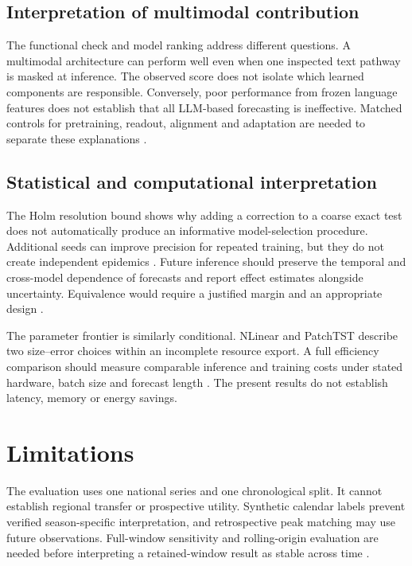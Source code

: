 \documentclass[journal,twoside,print]{ieeecolor}
\begin{document}
\subsection{Interpretation of multimodal contribution}
The functional check and model ranking address different questions. A multimodal architecture can perform well even when one inspected text pathway is masked at inference. The observed score does not isolate which learned components are responsible. Conversely, poor performance from frozen language features does not establish that all LLM-based forecasting is ineffective. Matched controls for pretraining, readout, alignment and adaptation are needed to separate these explanations \cite{r6,r13}.

\subsection{Statistical and computational interpretation}
The Holm resolution bound shows why adding a correction to a coarse exact test does not automatically produce an informative model-selection procedure. Additional seeds can improve precision for repeated training, but they do not create independent epidemics \cite{r19}. Future inference should preserve the temporal and cross-model dependence of forecasts and report effect estimates alongside uncertainty. Equivalence would require a justified margin and an appropriate design \cite{r25}.

The parameter frontier is similarly conditional. NLinear and PatchTST describe two size--error choices within an incomplete resource export. A full efficiency comparison should measure comparable inference and training costs under stated hardware, batch size and forecast length \cite{r5}. The present results do not establish latency, memory or energy savings.

\section{Limitations}
The evaluation uses one national series and one chronological split. It cannot establish regional transfer or prospective utility. Synthetic calendar labels prevent verified season-specific interpretation, and retrospective peak matching may use future observations. Full-window sensitivity and rolling-origin evaluation are needed before interpreting a retained-window result as stable across time \cite{r23}.
\end{document}
